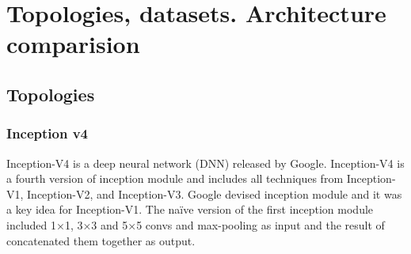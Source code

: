 \documentclass[titlepage]{report}
\begin{document}

\chapter{Topologies, datasets. Architecture comparision}

\section{Topologies}
\lipsum[3]

\subsection{Inception v4}
Inception-V4 is a deep neural network (DNN) released by Google. Inception-V4 is a fourth version of inception module and includes all techniques from Inception-V1, Inception-V2, and Inception-V3. Google devised inception module and it was a key idea for Inception-V1. The naïve version of the first inception module included 1×1, 3×3 and 5×5 convs and max-pooling as input and the result of concatenated them together as output. \\
\pagebreak
\end{document}
